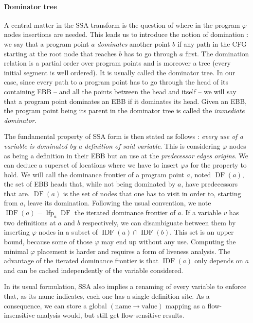 \documentclass[11pt]{article}
\renewcommand{\phi}{\varphi}
\DeclareMathOperator{\lfp}{lfp}
\DeclareMathOperator{\DF}{DF}
\DeclareMathOperator{\IDF}{IDF}
\begin{document}
\paragraph{Dominator tree} A central matter in the SSA transform is the question of where in the program $\phi$ nodes insertions are needed.
This leads us to introduce the notion of domination : we say that a program point $a$ \emph{dominates} another point $b$ if any path in the CFG starting at the root node that reaches $b$ has to go through $a$ first. The domination relation is a partial order over program points and is moreover a tree (every initial segment is well ordered). It is usually called the dominator tree. In our case, since every path to a program point has to go through the head of its containing EBB -- and all the points between the head and itself -- we will say that a program point dominates an EBB if it dominates its head. Given an EBB, the program point being its parent in the dominator tree is called the \emph{immediate dominator}.

The fundamental property of SSA form is then stated as follows : \emph{every use of a variable is dominated by a definition of said variable}. This is considering $\phi$ nodes as being a definition in their EBB but an use at the \emph{predecessor edges origins}. We can deduce a superset of locations where we have to insert $\phi s$ for the property to hold.
We will call the dominance frontier of a program point $a$, noted $\DF(a)$, the set of EBB heads that, while not being dominated by $a$, have predecessors that are. $\DF(a)$ is the set of nodes that one has to visit in order to, starting from $a$, leave its domination.
Following the usual convention, we note $\IDF(a) = \lfp_a\DF$ the iterated dominance frontier of $a$.
If a variable $v$ has two definitions at $a$ and $b$ respectively, we can disambiguate between them by inserting $\phi$ nodes in a subset of $\IDF(a)\cap\IDF(b)$.
This set is an upper bound, because some of those $\phi$ may end up without any use. Computing the minimal $\phi$ placement is harder and requires a form of liveness analysis.
The advantage of the iterated dominance frontier is that $\IDF(a)$ only depends on $a$ and can be cached independently of the variable considered.

In its usual formulation, SSA also implies a renaming of every variable to enforce that, as its name indicates, each one has a single definition site. As a consequence, we can store a global $(\text{name}\to\text{value})$ mapping as a flow-insensitive analysis would, but still get flow-sensitive results.
\end{document}
